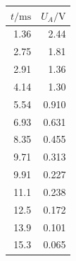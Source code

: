 \documentclass[]{scrartcl}
\begin{document}
\begin{table}[H]
	\centering
	\label{tab:peak}
	\hskip-1.50cm
	\begin{tabular}{r r}
		\toprule
		$t/\si{\milli\second}$ & $U_A / \si{\volt}$ \\
		\midrule
		1.36 & 2.44 \\
		2.75 & 1.81 \\
		2.91 & 1.36 \\
		4.14 & 1.30 \\
		5.54 & 0.910 \\
		6.93 & 0.631 \\
		8.35 & 0.455 \\
		9.71 & 0.313 \\
		9.91 & 0.227 \\
		11.1 & 0.238 \\
		12.5 & 0.172 \\
		13.9 & 0.101 \\
		15.3 & 0.065 \\
		\bottomrule
	\end{tabular}
\end{table}
\end{document}
